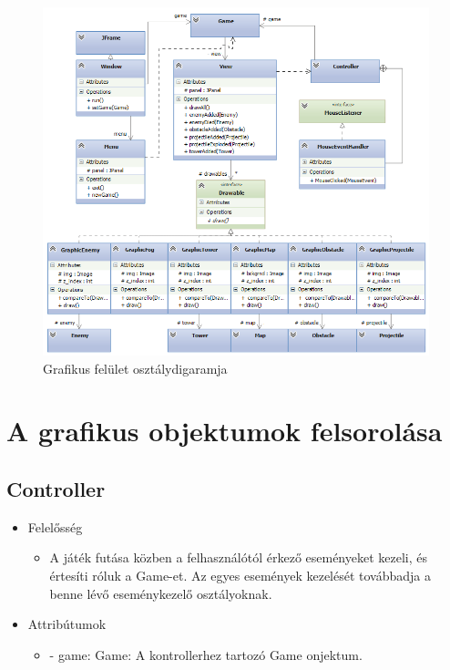 \begin{figure}[H]
\begin{center}
\includegraphics[width=18cm]{images/ch11/very_final_uml_doge_diagram.png}
\caption{Grafikus felület osztálydigaramja}
\label{fig:Graphic_class_diag}
\end{center}
\end{figure}

\pagebreak
\section{A grafikus objektumok felsorolása}

\subsection{Controller}
\begin{itemize}
\item Felelősség
\begin{itemize}
	\item A játék futása közben a felhasználótól érkező eseményeket kezeli, és értesíti róluk a Game-et. Az egyes események kezelését továbbadja a benne lévő eseménykezelő osztályoknak.
\end{itemize}
\item Attribútumok
	\begin{itemize}
		\item - game: Game: A kontrollerhez tartozó Game onjektum.
	\end{itemize}
\end{itemize}

